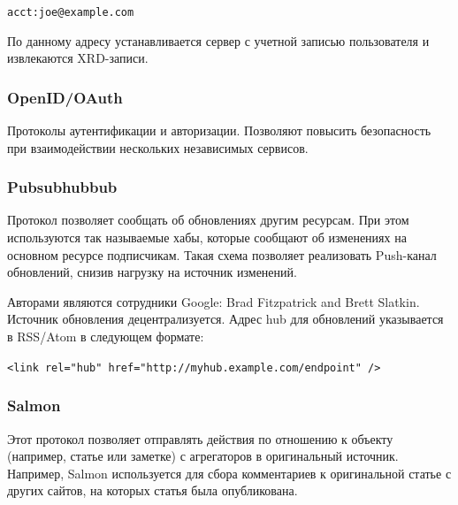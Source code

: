 \documentclass[10pt, a5paper]{article}
\begin{document}
    \verb!acct:joe@example.com!

    По данному адресу устанавливается сервер с учетной записью
    пользователя и извлекаются XRD-записи.

 \subsubsection*{OpenID/OAuth}
  \begin{figure}[ht]
\end{figure}
    Протоколы аутентификации и авторизации. Позволяют повысить
    безопасность при взаимодействии нескольких независимых сервисов.

    \subsubsection*{Pubsubhubbub}
   \begin{figure}[ht]
\end{figure}
    Протокол позволяет сообщать об обновлениях другим ресурсам. При этом
    используются так называемые хабы, которые сообщают об изменениях на
    основном ресурсе подписчикам. Такая схема позволяет реализовать 
    Push-канал обновлений, снизив нагрузку на источник изменений.

    Авторами являются сотрудники Google: Brad Fitzpatrick and Brett
    Slatkin. Источник обновления децентрализуется. Адрес hub для
    обновлений указывается в RSS/Atom в следующем формате:

     \verb!<link rel="hub" href="http://myhub.example.com/endpoint" />!


     \subsubsection*{Salmon}
    \begin{figure}[ht]
\end{figure}
    Этот протокол позволяет отправлять действия по отношению к объекту
    (например, статье или заметке) с агрегаторов в оригинальный
    источник. Например, Salmon используется для сбора комментариев к
    оригинальной статье с других сайтов, на которых статья была
    опубликована.
\end{document}
